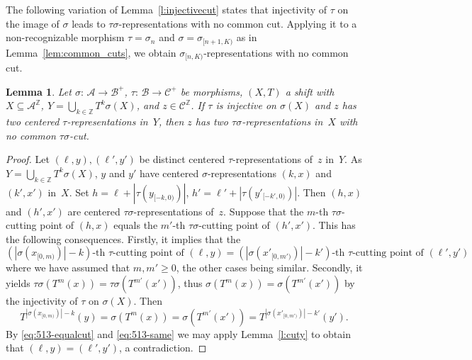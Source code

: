 \documentclass{amsart}
\newtheorem{lemma}{Lemma}[section]
\theoremstyle{definition}
\theoremstyle{remark}
\numberwithin{equation}{section}
\begin{document}
The following variation of Lemma~\ref{l:injectivecut} states that injectivity of $\tau$ on the image of $\sigma$ leads to $\tau \sigma$-representations with no common cut.
Applying it to a non-recognizable morphism $\tau = \sigma_n$ and $\sigma = \sigma_{[n+1,K)}$ as in Lemma~\ref{lem:common_cuts}, we obtain $\sigma_{[n,K)}$-representations with no common cut.

\begin{lemma} \label{l:ikcuts}
Let $\sigma:\, \mathcal{A} \to \mathcal{B}^+$, $\tau:\, \mathcal{B} \to \mathcal{C}^+$ be morphisms, $(X,T)$ a shift with $X \subseteq \mathcal{A}^\mathbb{Z}$, $Y = \bigcup_{k\in\mathbb{Z}} T^k\sigma(X)$, and $z \in \mathcal{C}^\mathbb{Z}$. 
If $\tau$ is injective on $\sigma(X)$ and $z$ has two centered $\tau$-representations in~$Y$, then $z$ has two $\tau \sigma$-representations in~$X$ with no common $\tau \sigma$-cut. 
\end{lemma}

\begin{proof}
Let $(\ell,y), (\ell',y')$ be distinct centered $\tau$-representations of~$z$ in~$Y$.
As $Y = \bigcup_{k\in\mathbb{Z}} T^k\sigma(X)$, $y$ and $y'$ have centered $\sigma$-representations $(k,x)$ and $(k',x')$ in~$X$.
Set $h = \ell+|\tau(y_{[-k,0)})|$, $h' = \ell'+|\tau(y'_{[-k',0)})|$. 
Then $(h,x)$ and $(h',x')$ are centered $\tau \sigma$-representations of~$z$. 
Suppose that the $m$-th $\tau \sigma$-cutting point of $(h,x)$ equals the $m'$-th $\tau \sigma$-cutting point of $(h',x')$. 
This has the following consequences. 
Firstly, it implies that the
\begin{equation}\label{eq:513-equalcut} 
\mbox{$(|\sigma(x_{[0,m)})|{-}k)$-th $\tau$-cutting point of $(\ell,y)$} = \mbox{$(|\sigma(x'_{[0,m')})|{-}k')$-th $\tau$-cutting point of $(\ell',y')$}
\end{equation}
where we have assumed that $m, m' \ge 0$, the other cases being similar. 
Secondly, it yields $\tau\sigma(T^m(x)) = \tau\sigma(T^{m'}(x'))$, thus $\sigma(T^m(x)) = \sigma(T^{m'}(x'))$ by the injectivity of $\tau$ on $\sigma(X)$. 
Then 
\begin{equation}\label{eq:513-same}
T^{|\sigma(x_{[0,m)})|-k}(y) = \sigma(T^m(x)) = \sigma(T^{m'}(x')) =  T^{|\sigma(x'_{[0,m')})|-k'}(y').
\end{equation}
By \eqref{eq:513-equalcut} and \eqref{eq:513-same} we may apply Lemma~\ref{l:cuty} to obtain that $(\ell,y) = (\ell',y')$, a contradiction. 
\end{proof}
\end{document}
